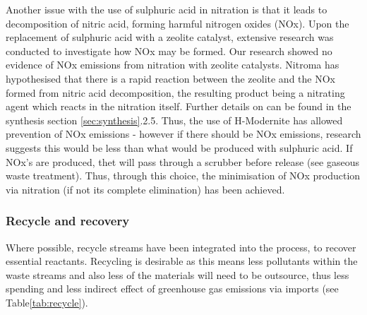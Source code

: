 
Another issue with the use of sulphuric acid in nitration is that it leads to decomposition of nitric acid, forming harmful nitrogen oxides (NOx). Upon the replacement of sulphuric acid with a zeolite catalyst, extensive research was conducted to investigate how NOx may be formed. Our research showed no evidence of NOx emissions from nitration with zeolite catalysts. Nitroma has hypothesised that there is a rapid reaction between the zeolite and the NOx formed from nitric acid decomposition, the resulting product being a nitrating agent which reacts in the nitration itself. Further details on can be found in the synthesis section \ref{sec:synthesis}.2.5. Thus, the use of H-Modernite has allowed prevention of NOx emissions - however if there should be NOx emissions, research suggests this would be less than what would be produced with sulphuric acid. If NOx's are produced, thet will pass through a scrubber before release (see gaseous waste treatment). Thus, through this choice, the minimisation of NOx production via nitration (if not its complete elimination) has been achieved. 


\subsubsection{Recycle and recovery}

Where possible, recycle streams have been integrated into the process, to recover essential reactants. Recycling is desirable as this means less pollutants within the waste streams and also less of the materials will need to be outsource, thus less spending and less indirect effect of greenhouse gas emissions via imports (see Table\ref{tab:recycle}).

